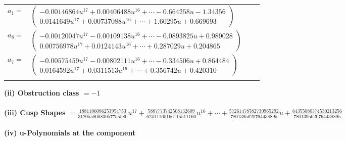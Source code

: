 \documentclass[1p]{elsarticle_modified}
\theoremstyle{definition}
\begin{document}
\begin{tabular}{m{7pt} m{180pt} m{7pt} m{180pt} }
\flushright $a_{1}=$&$\begin{pmatrix}-0.00146864 u^{17}+0.00406488 u^{16}+\cdots-0.664258 u-1.34356\\0.0141649 u^{17}+0.00737088 u^{16}+\cdots+1.60295 u+0.669693\end{pmatrix}$ \\
\flushright $a_{8}=$&$\begin{pmatrix}-0.00120047 u^{17}-0.00109138 u^{16}+\cdots-0.0893825 u+0.989028\\0.00756978 u^{17}+0.0124143 u^{16}+\cdots+0.287029 u+0.204865\end{pmatrix}$ \\
\flushright $a_{7}=$&$\begin{pmatrix}-0.00575459 u^{17}-0.00802111 u^{16}+\cdots-0.334506 u+0.864484\\0.0164592 u^{17}+0.0311513 u^{16}+\cdots+0.356742 u+0.420310\end{pmatrix}$\\&\end{tabular}
\flushleft \textbf{(ii) Obstruction class $= -1$}\\~\\
\flushleft \textbf{(iii) Cusp Shapes $= \frac{1881106086253954753}{31205580083057755580} u^{17}+\frac{5887773742508132609}{62411160166115511160} u^{16}+\cdots+\frac{57261478582730965292}{7801395020764438895} u+\frac{64355080374530213256}{7801395020764438895}$}\\~\\
\newpage\renewcommand{\arraystretch}{1}
\flushleft \textbf{(iv) u-Polynomials at the component}\newline \\
\end{document}
